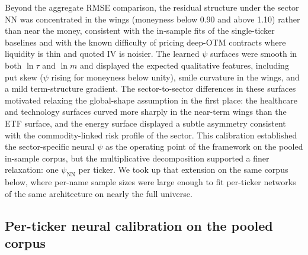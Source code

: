 Beyond the aggregate RMSE comparison, the residual structure under the sector NN was concentrated in the wings (moneyness below 0.90 and above 1.10) rather than near the money, consistent with the in-sample fits of the single-ticker baselines and with the known difficulty of pricing deep-OTM contracts where liquidity is thin and quoted IV is noisier. The learned $\psi$ surfaces were smooth in both $\ln\tau$ and $\ln m$ and displayed the expected qualitative features, including put skew ($\psi$ rising for moneyness below unity), smile curvature in the wings, and a mild term-structure gradient. The sector-to-sector differences in these surfaces motivated relaxing the global-shape assumption in the first place: the healthcare and technology surfaces curved more sharply in the near-term wings than the ETF surface, and the energy surface displayed a subtle asymmetry consistent with the commodity-linked risk profile of the sector. This calibration established the sector-specific neural $\psi$ as the operating point of the framework on the pooled in-sample corpus, but the multiplicative decomposition supported a finer relaxation: one $\psi_{\text{NN}}$ per ticker. We took up that extension on the same corpus below, where per-name sample sizes were large enough to fit per-ticker networks of the same architecture on nearly the full universe.

\subsection{Per-ticker neural calibration on the pooled corpus}\label{sec:per_ticker_nn}

